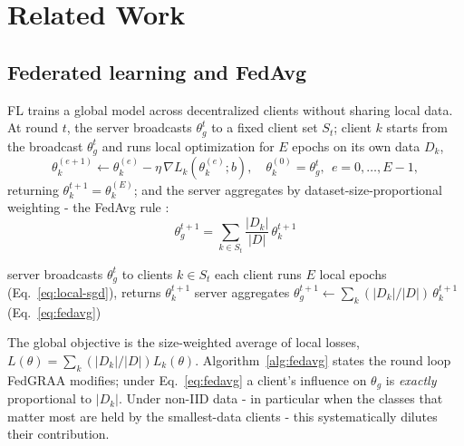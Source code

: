 \documentclass[11pt,a4paper]{report}
\begin{document}
\chapter{Related Work}
\label{ch:related}

\section{Federated learning and FedAvg}
\label{sec:fedavg}

FL trains a global model across decentralized clients without sharing local
data. At round $t$, the server broadcasts $\theta_g^t$ to a fixed client set
$S_t$; client $k$ starts from the broadcast $\theta_g^t$ and runs local
optimization for $E$ epochs on its own data $D_k$,
\begin{equation}
\theta_k^{(e+1)} \leftarrow \theta_k^{(e)} - \eta\, \nabla L_k(\theta_k^{(e)}; b),
\quad \theta_k^{(0)} = \theta_g^t,\ \ e = 0,\dots,E{-}1,
\label{eq:local-sgd}
\end{equation}
returning $\theta_k^{t+1} = \theta_k^{(E)}$; and the server aggregates by
dataset-size-proportional weighting - the
FedAvg rule \cite{mcmahan2017fedavg}:
\begin{equation}
\theta_g^{t+1} = \sum_{k \in S_t} \frac{|D_k|}{|D|}\, \theta_k^{t+1}
\label{eq:fedavg}
\end{equation}

\begin{algorithm}[htbp]
\caption{Federated round (FedAvg; the loop FedGRAA modifies)}
\label{alg:fedavg}
\begin{algorithmic}[1]
  \State server broadcasts $\theta_g^t$ to clients $k \in S_t$
  \State each client runs $E$ local epochs (Eq.~\eqref{eq:local-sgd}),
    returns $\theta_k^{t+1}$
  \State server aggregates $\theta_g^{t+1} \gets \sum_k (|D_k|/|D|)\,
    \theta_k^{t+1}$ (Eq.~\eqref{eq:fedavg})
\EndFor
\end{algorithmic}
\end{algorithm}

The global objective is the size-weighted average of local losses,
$L(\theta)=\sum_k (|D_k|/|D|)L_k(\theta)$. Algorithm~\ref{alg:fedavg}
states the round loop FedGRAA modifies; under Eq.~\eqref{eq:fedavg} a
client's influence on $\theta_g$ is \emph{exactly} proportional to $|D_k|$.
Under non-IID data - in particular when the classes that matter most are held
by the smallest-data clients - this systematically dilutes their contribution.
\end{document}
